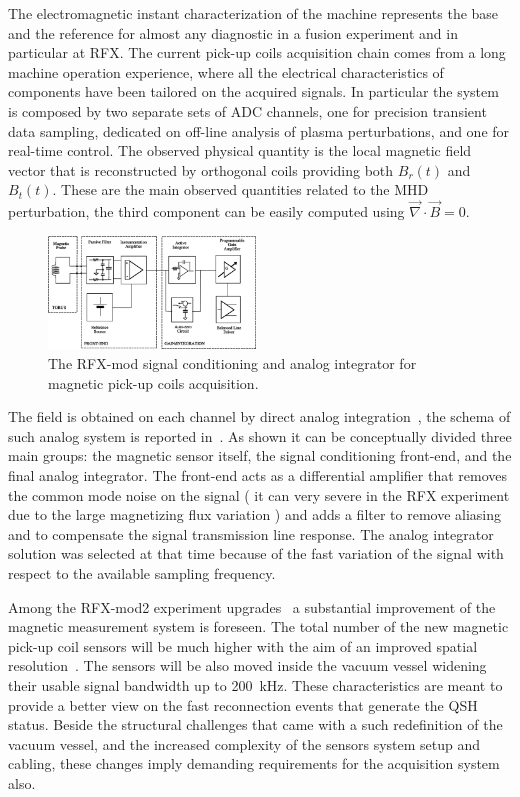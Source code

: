 The electromagnetic instant characterization of the machine represents the base and the reference for almost any diagnostic in a fusion experiment and in particular at RFX. 
The current pick-up coils acquisition chain comes from a long machine operation experience, where all the electrical characteristics of components have been tailored on the acquired signals. In particular the system is composed by two separate sets of ADC channels, one for precision transient data sampling, dedicated on off-line analysis of plasma perturbations, and one for real-time control. The observed physical quantity is the local magnetic field vector that is reconstructed by orthogonal coils providing both $B_r(t)$ and $B_t(t)$. These are the main observed quantities related to the MHD perturbation, the third component can be easily computed using $\Vec{\nabla} \cdot \Vec{B} = 0$.
%
\begin{figure}
    \centering
    \includegraphics[width=0.49\textwidth]{img/rfx/conditioning_circuit.png}
    \caption{The RFX-mod signal conditioning and analog integrator for magnetic pick-up coils acquisition. }
    \label{fig:pomaro_integrator}
\end{figure}
%
The field is obtained on each channel by direct analog integration~\cite{pomaro2005transducers}, the schema of such analog system is reported in~\Figure{\ref{fig:pomaro_integrator}}. As shown it can be conceptually divided three main groups: the magnetic sensor itself, the signal conditioning front-end, and the final analog integrator.
The front-end acts as a differential amplifier that removes the common mode noise on the signal ( it can very severe in the RFX experiment due to the large magnetizing flux variation ) and adds a filter to remove aliasing and to compensate the signal transmission line response.
The analog integrator solution was selected at that time because of the fast variation of the signal with respect to the available sampling frequency. 

Among the RFX-mod2 experiment upgrades~\cite{Peruzzo2018} a substantial improvement of the magnetic measurement system is foreseen. The total number of the new magnetic pick-up coil sensors will be much higher with the aim of an improved spatial resolution~\cite{marchiori2017upgraded}. 
The sensors will be also moved inside the vacuum vessel widening their usable signal bandwidth up to 200~kHz. These characteristics are meant to provide a better view on the fast reconnection events that generate the QSH status. Beside the structural challenges that came with a such redefinition of the vacuum vessel, and the increased complexity of the sensors system setup and cabling, these changes imply demanding requirements for the acquisition system also. 

